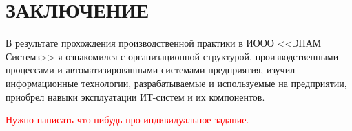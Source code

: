 \section*{ЗАКЛЮЧЕНИЕ}

В результате прохождения производственной практики в ИООО <<ЭПАМ Системз>> я ознакомился с
организационной структурой, производственными процессами и автоматизированными системами предприятия,
изучил информационные технологии, разрабатываемые и используемые на предприятии,
приобрел навыки эксплуатации ИТ-систем и их компонентов.

\textcolor{red}{Нужно написать что-нибудь про индивидуальное задание.}